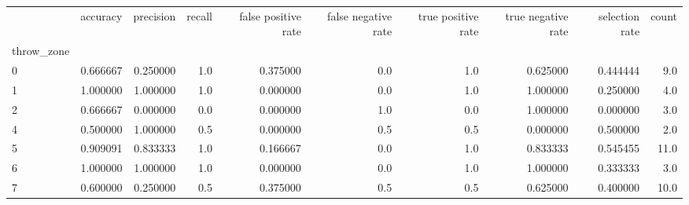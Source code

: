 \begin{tabular}{lrrrrrrrrr}
\toprule
{} &  accuracy &  precision &  recall &  false positive rate &  false negative rate &  true positive rate &  true negative rate &  selection rate &  count \\
throw\_zone &           &            &         &                      &                      &                     &                     &                 &        \\
\midrule
0          &  0.666667 &   0.250000 &     1.0 &             0.375000 &                  0.0 &                 1.0 &            0.625000 &        0.444444 &    9.0 \\
1          &  1.000000 &   1.000000 &     1.0 &             0.000000 &                  0.0 &                 1.0 &            1.000000 &        0.250000 &    4.0 \\
2          &  0.666667 &   0.000000 &     0.0 &             0.000000 &                  1.0 &                 0.0 &            1.000000 &        0.000000 &    3.0 \\
4          &  0.500000 &   1.000000 &     0.5 &             0.000000 &                  0.5 &                 0.5 &            0.000000 &        0.500000 &    2.0 \\
5          &  0.909091 &   0.833333 &     1.0 &             0.166667 &                  0.0 &                 1.0 &            0.833333 &        0.545455 &   11.0 \\
6          &  1.000000 &   1.000000 &     1.0 &             0.000000 &                  0.0 &                 1.0 &            1.000000 &        0.333333 &    3.0 \\
7          &  0.600000 &   0.250000 &     0.5 &             0.375000 &                  0.5 &                 0.5 &            0.625000 &        0.400000 &   10.0 \\
\bottomrule
\end{tabular}
